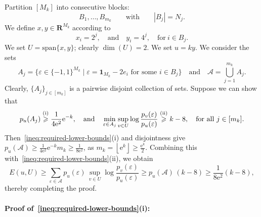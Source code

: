 \documentclass[11pt, letterpaper, hidelinks]{article}
\makeatletter
\renewcommand{\proofname}{\textit{\textbf{Proof}}}
\renewenvironment{proof}[1][\proofname]{\par\pushQED{\qed}\normalfont \topsep6\p@\@plus6\p@\relax\trivlist\item[\hskip\labelsep#1\@addpunct{}]\ignorespaces}{\popQED\endtrivlist\@endpefalse}
\newcommand{\R}{\mathbf R}
\newcommand{\cA}{\mathcal{A}}
\newcommand{\floor}[1]{\left\lfloor #1 \right\rfloor}
\newcommand{\e}{\mathrm{e}}
\newcommand{\1}{\mathbf 1}
\newcommand{\eps}{\varepsilon}
\renewcommand{\geq}{\geqslant}
\newcommand{\spn}{\mathrm{span}}
\let\Span\spn
\theoremstyle{plain}
\theoremstyle{definition}
\makeatother
\begin{document}
\begin{proof}[Proof of~\Cref{lem:a-single-block}]
Partition $[M_k]$ into consecutive blocks:
\[
B_{1},\dots,B_{m_k} \qquad\text{with}\qquad |B_j|=N_j.
\]
We define $x, y \in \R^{M_k}$ according to
\[
x_i = 2^j,
\quad \mbox{and} \quad 
y_i =4^j,
\quad \mbox{for}~i \in B_{j}.
\]
We set $U = \Span\{x, y\}$; clearly $\dim(U) = 2$. We set $u = k y$.
We consider the sets 
\[
A_j = \big\{\eps \in \{-1, 1\}^{M_k} \mid
\eps = \1_{M_k} - 2e_i \text{ for some } i \in B_j\big\}
\quad \mbox{and} \quad 
\cA = \bigcup_{j=1}^{m_k} A_j.
\]
Clearly, $\{A_j\}_{j \in [m_k]}$ is a pairwise disjoint collection of sets.
Suppose we can show that 
\begin{equation}
\label{ineq:required-lower-bounds}
p_u(A_j) \stackrel{{\rm (i)}}{\geq} \frac{1}{4\e^2} \e^{-k}, 
\quad \mbox{and} \quad 
\min_{\eps \in A_j} 
\sup_{v \in U}
\log \frac{p_v(\eps)}{p_u(\eps)} \stackrel{{\rm (ii)}}{\geq} k - 8, \quad \mbox{for all}~j\in[m_k].
\end{equation}
Then~\cref{ineq:required-lower-bounds}(i) and disjointness give $p_u(\cA) \geq \frac{1}{4 \e^2} \e^{-k} m_k
\geq \tfrac{1}{8\e^2}$, as $m_k = \floor{\e^k} \geq \tfrac{\e^k}{2}$.
Combining this with~\cref{ineq:required-lower-bounds}(ii), we obtain
\[
E(u,U)
	\geq \sum_{\eps \in \cA} p_u(\eps) \, \sup_{v \in U} \log \frac{p_v(\eps)}{p_u(\eps)} 
	\geq p_u(\cA) \, (k-8)
	\geq \frac{1}{8\e^2}(k-8),
\]
thereby completing the proof. 

\paragraph{Proof of~\cref{ineq:required-lower-bounds}(i):}


\end{proof}
\end{document}
